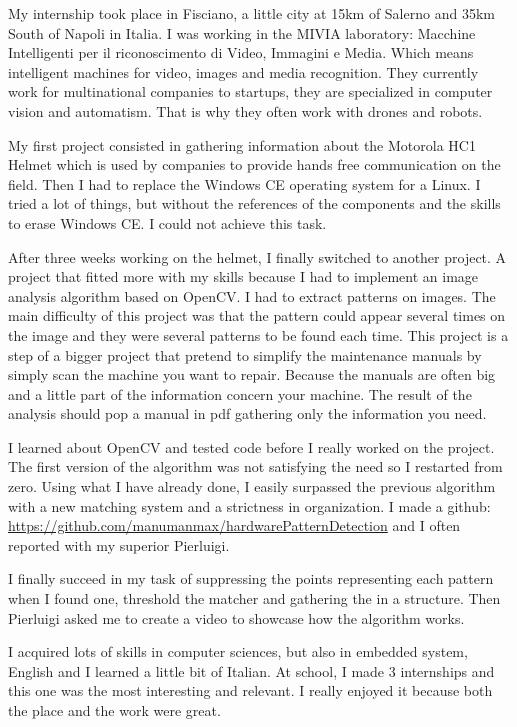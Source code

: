 \documentclass[english,a4paper,11pt]{report}
\begin{document}
	\par My internship took place in Fisciano, a little city at 15km of Salerno and 35km South of Napoli in Italia. I was working in the MIVIA laboratory: Macchine Intelligenti per il riconoscimento di Video, Immagini e Media. Which means intelligent machines for video, images and media recognition. They currently work for multinational companies to startups, they are specialized in computer vision and automatism. That is why they often work with drones and robots.
	\par My first project consisted in gathering information about the Motorola HC1 Helmet which is used by companies to provide hands free communication on the field. Then I had to replace the Windows CE operating system for a Linux. I tried a lot of things, but without the references of the components and the skills to erase Windows CE. I could not achieve this task.
	\par After three weeks working on the helmet, I finally switched to another project. A project that fitted more with my skills because I had to implement an image analysis algorithm based on OpenCV. I had to extract patterns on images. The main difficulty of this project was that the pattern could appear several times on the image and they were several patterns to be found each time. This project is a step of a bigger project that pretend to simplify the maintenance manuals by simply scan the machine you want to repair. Because the manuals are often big and a little part of the information concern your machine. The result of the analysis should pop a manual in pdf gathering only the information you need.
	\par I learned about OpenCV and tested code before I really worked on the project. The first version of the algorithm was not satisfying the need so I restarted from zero. Using what I have already done, I easily surpassed the previous algorithm with a new matching system and a strictness in organization. I made a github: \url{https://github.com/manumanmax/hardwarePatternDetection} and I often reported with my superior Pierluigi.
	\par I finally succeed in my task of suppressing the points representing each pattern when I found one, threshold the matcher and gathering the in a structure. Then Pierluigi asked me to create a video to showcase how the algorithm works.
	
	\par I acquired lots of skills in computer sciences, but also in embedded system, English and I learned a little bit of Italian. At school, I made 3 internships and this one was the most interesting and relevant. I really enjoyed it because both the place and the work were great.
	
	
	
\end{document}
